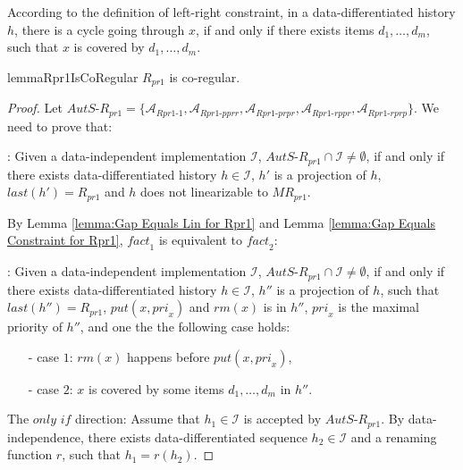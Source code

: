 \documentclass{llncs}
\begin{document}
According to the definition of left-right constraint, in a data-differentiated history $h$, there is a cycle going through $x$, if and only if there exists items $d_1,\ldots,d_m$, such that $x$ is covered by $d_1,\ldots,d_m$.



\begin{restatable}{lemma}{Rpr1IsCoRegular}
\label{lemma:Rpr1 is co-regular}
$R_{\textit{pr1}}$ is co-regular.
\end{restatable}

\begin {proof}

Let $\textit{AutS-R}_{\textit{pr1}} = \{ \mathcal{A}_{\textit{Rpr1-1}} , \mathcal{A}_{\textit{Rpr1-pprr}}, \mathcal{A}_{\textit{Rpr1-prpr}}, \mathcal{A}_{\textit{Rpr1-rppr}}, \mathcal{A}_{\textit{Rpr1-rprp}} \}$. We need to prove that:

: Given a data-independent implementation $\mathcal{I}$, $\textit{AutS-R}_{\textit{pr1}} \cap \mathcal{I} \neq \emptyset$, if and only if there exists data-differentiated history $h \in \mathcal{I}$, $h'$ is a projection of $h$, $\textit{last}(h') = R_{\textit{pr1}}$ and $h$ does not linearizable to $\textit{MR}_{\textit{pr1}}$.

By Lemma \ref{lemma:Gap Equals Lin for Rpr1} and Lemma \ref{lemma:Gap Equals Constraint for Rpr1}, $\textit{fact}_1$ is equivalent to $\textit{fact}_2$:

: Given a data-independent implementation $\mathcal{I}$, $\textit{AutS-R}_{\textit{pr1}} \cap \mathcal{I} \neq \emptyset$, if and only if there exists data-differentiated history $h \in \mathcal{I}$, $h''$ is a projection of $h$, such that $\textit{last}(h'') = R_{\textit{pr1}}$, $\textit{put}(x,\textit{pri}_x)$ and $\textit{rm}(x)$ is in $h''$, $\textit{pri}_x$ is the maximal priority of $h''$, and one the the following case holds:

\begin{itemize}
\setlength{\itemsep}{0.5pt}
\item[-] case $1$: $\textit{rm}(x)$ happens before $\textit{put}(x,\textit{pri}_x)$,
\item[-] case $2$: $x$ is covered by some items $d_1,\ldots,d_m$ in $h''$.
\end{itemize}

\noindent The $\textit{only if}$ direction: Assume that $h_1 \in \mathcal{I}$ is accepted by $\textit{AutS-R}_{\textit{pr1}}$. By data-independence, there exists data-differentiated sequence $h_2 \in \mathcal{I}$ and a renaming function $r$, such that $h_1=r(h_2)$.


\end{proof}
\end{document}
